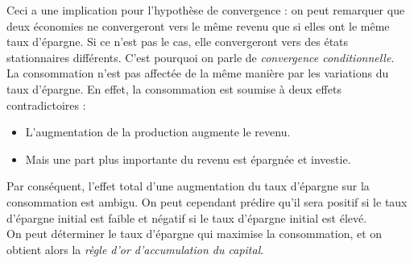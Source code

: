 \documentclass[10pt]{book}
\begin{document}
Ceci a une implication pour l'hypothèse de convergence : on peut remarquer que deux économies ne convergeront vers le même revenu que si elles ont le même taux d'épargne. Si ce n'est pas le cas, elle convergeront vers des états stationnaires différents. C'est pourquoi on parle de \textit{convergence conditionnelle}. \\
La consommation n'est pas affectée de la même manière par les variations du taux d'épargne. En effet, la consommation est soumise à deux effets contradictoires : 
\begin{itemize}
  \item L'augmentation de la production augmente le revenu.
  \item Mais une part plus importante du revenu est épargnée et investie.
\end{itemize}
Par conséquent, l'effet total d'une augmentation du taux d'épargne sur la consommation est ambigu. On peut cependant prédire qu'il sera positif si le taux d'épargne initial est faible et négatif si le taux d'épargne initial est élevé. \\
On peut déterminer le taux d'épargne qui maximise la consommation, et on obtient alors la \textit{règle d'or d'accumulation du capital}.
\end{document}
